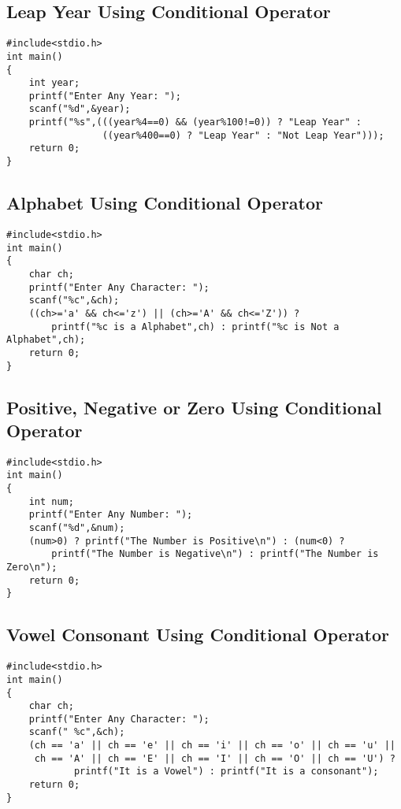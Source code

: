 \documentclass[a4paper,14pt]{article}
\begin{document}
\subsection{Leap Year Using Conditional Operator}
\vspace{0.5cm}
\begin{lstlisting}[caption={Leap Year Using Conditional Operator}]
#include<stdio.h>
int main()
{
    int year;
    printf("Enter Any Year: ");
    scanf("%d",&year);
    printf("%s",(((year%4==0) && (year%100!=0)) ? "Leap Year" : 
                 ((year%400==0) ? "Leap Year" : "Not Leap Year")));
    return 0;
}
\end{lstlisting}
\newpage

\subsection{Alphabet Using Conditional Operator}
\vspace{0.5cm}
\begin{lstlisting}[caption={Alphabet Using Conditional Operator}]
#include<stdio.h>
int main()
{
    char ch;
    printf("Enter Any Character: ");
    scanf("%c",&ch);
    ((ch>='a' && ch<='z') || (ch>='A' && ch<='Z')) ? 
        printf("%c is a Alphabet",ch) : printf("%c is Not a Alphabet",ch);
    return 0;
}
\end{lstlisting}
\newpage

\subsection{Positive, Negative or Zero Using Conditional Operator}
\vspace{0.5cm}
\begin{lstlisting}[caption={Positive, Negative or Zero Using Conditional Operator}]
#include<stdio.h>
int main()
{
    int num;
    printf("Enter Any Number: ");
    scanf("%d",&num);
    (num>0) ? printf("The Number is Positive\n") : (num<0) ? 
        printf("The Number is Negative\n") : printf("The Number is Zero\n");
    return 0;
}
\end{lstlisting}
\newpage

\subsection{Vowel Consonant Using Conditional Operator}
\vspace{0.5cm}
\begin{lstlisting}[caption={Vowel Consonant Using Conditional Operator}]
#include<stdio.h>
int main()
{
    char ch;
    printf("Enter Any Character: ");
    scanf(" %c",&ch);
    (ch == 'a' || ch == 'e' || ch == 'i' || ch == 'o' || ch == 'u' ||
     ch == 'A' || ch == 'E' || ch == 'I' || ch == 'O' || ch == 'U') ? 
            printf("It is a Vowel") : printf("It is a consonant");
    return 0;
}
\end{lstlisting}
\newpage
\end{document}
